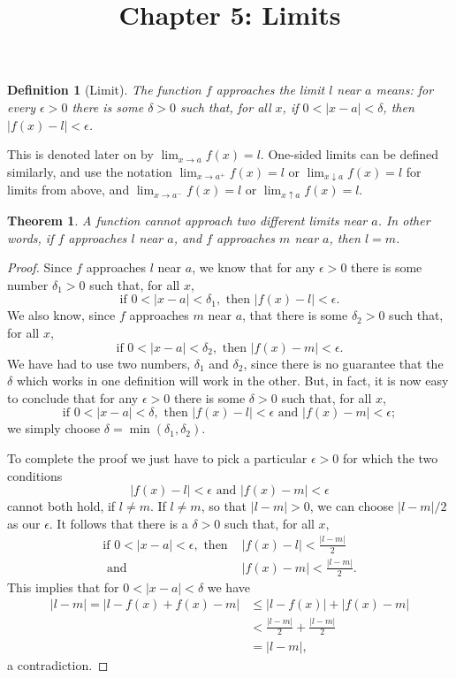 \documentclass{article}
\newtheorem{definition}{Definition}
\newtheorem{theorem}{Theorem}
\begin{document}
\title{Chapter 5: Limits}
\maketitle

\begin{definition}[Limit]
  The function \emph{$f$ approaches the limit $l$ near $a$} means: for every
  $\epsilon > 0$ there is some $\delta > 0$ such that, for all $x$, if $0 < |x
  - a| < \delta$, then $|f(x) - l| < \epsilon$.
\end{definition}
This is denoted later on by $\lim_{x \to a} f(x) = l$. One-sided limits can be
defined similarly, and use the notation $\lim_{x \to a^+} f(x) = l$ or $\lim_{x
\downarrow a} f(x) = l$ for limits from above, and $\lim_{x \to a^-} f(x) = l$
or $\lim_{x \uparrow a} f(x) = l$.

\begin{theorem}
  A function cannot approach two different limits near $a$. In other words, if
  $f$ approaches $l$ near $a$, and $f$ approaches $m$ near $a$, then $l = m$.
\end{theorem}
\begin{proof}
  Since $f$ approaches $l$ near $a$, we know that for any $\epsilon > 0$ there
  is some number $\delta_1 > 0$ such that, for all $x$, \[
    \text{if } 0 < |x - a| < \delta_1, \text{ then } |f(x) - l| < \epsilon.
  \] We also know, since $f$ approaches $m$ near $a$, that there is some
  $\delta_2 > 0$ such that, for all $x$, \[
    \text{if } 0 < |x - a| < \delta_2, \text{ then } |f(x) - m| < \epsilon.
  \] We have had to use two numbers, $\delta_1$ and $\delta_2$, since there is
  no guarantee that the $\delta$ which works in one definition will work in the
  other. But, in fact, it is now easy to conclude that for any $\epsilon > 0$
  there is some $\delta > 0$ such that, for all $x$, \[
    \text{if } 0 < |x - a| < \delta, \text{ then } |f(x) - l| < \epsilon
    \text{ and } |f(x) - m| < \epsilon;
  \] we simply choose $\delta = \min(\delta_1, \delta_2)$.

  To complete the proof we just have to pick a particular $\epsilon > 0$ for
  which the two conditions \[
    |f(x) - l| < \epsilon \text{ and } |f(x) - m| < \epsilon
  \] cannot both hold, if $l \neq m$. If $l \neq m$, so that $|l - m| > 0$, we
  can choose $|l - m|/2$ as our $\epsilon$. It follows that there is a $\delta
  > 0$ such that, for all $x$,
  \begin{align*}
    \text{if } 0 < |x - a| < \epsilon,
    \text{ then } &|f(x) - l| < \frac{|l - m|}{2} \\
    \text{ and } &|f(x) - m| < \frac{|l - m|}{2}.
  \end{align*}
  This implies that for $0 < |x - a| < \delta$ we have
  \begin{align*}
    |l - m| = |l - f(x) + f(x) - m|
    &\leq |l - f(x)| + |f(x) - m| \\
    &< \frac{|l - m|}{2} + \frac{|l - m|}{2} \\
    &= |l - m|,
  \end{align*}
  a contradiction.
\end{proof}
\end{document}
